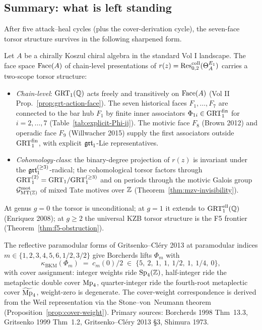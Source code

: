 \subsection*{Summary: what is left standing}

After five attack--heal cycles (plus the cover-derivation cycle), the
seven-face torsor structure survives in the following sharpened form.

\begin{theorem}\ClaimStatusScoped
\label{thm:seven-faces-two-scope}
Let $A$ be a chirally Koszul chiral algebra in the standard Vol I
landscape. The face space $\mathrm{Face}(A)$ of chain-level presentations of
$r(z) = \operatorname{Res}^{\mathrm{coll}}_{0,2}(\Theta_A^{E_1})$ carries a two-scope
torsor structure:
\begin{itemize}
\item[(A)] \emph{Chain-level}: $\mathrm{GRT}_1(\mathbb{Q})$ acts freely and transitively
on $\mathrm{Face}(A)$ (Vol II Prop.~\ref{prop:grt-action-face}). The seven
historical faces $F_1, \dots, F_7$ are connected to the bar hub $F_1$
by finite inner associators
$\Phi_{1i} \in \mathrm{GRT}_1^{\mathrm{fin}}$ for $i = 2, \dots, 7$
(Table~\ref{tab:explicit-Phi-ij}). The motivic face $F_8$ (Brown 2012)
and operadic face $F_9$ (Willwacher 2015) supply the first
associators outside $\mathrm{GRT}_1^{\mathrm{fin}}$, with explicit $\mathfrak{grt}_1$-Lie
representatives.
\item[(B)] \emph{Cohomology-class}: the binary-degree projection of
$r(z)$ is invariant under the $\mathfrak{grt}_1^{(\ge 3)}$-radical; the
cohomological torsor factors through $\mathrm{GRT}_1^{(2)} = \mathrm{GRT}_1/\mathrm{GRT}_1^{(\ge 3)}$
and on periods through the motivic Galois group
$\mathcal{G}^{\mathrm{mot}}_{\mathrm{MT}(\mathbb{Z})}$ of mixed Tate motives over $\mathbb{Z}$
(Theorem~\ref{thm:mzv-invisibility}).
\end{itemize}
At genus $g = 0$ the torsor is unconditional; at $g = 1$ it extends to
$\mathrm{GRT}_1^{\mathrm{ell}}(\mathbb{Q})$ (Enriquez 2008); at $g \ge 2$ the universal
KZB torsor structure is the F5 frontier
(Theorem~\ref{thm:f5-obstruction}).
\end{theorem}

\begin{theorem}
\ClaimStatusTheorem
\label{thm:eight-form-spread-plus-covers}
The reflective paramodular forms of Gritsenko--Cl\'ery 2013 at
paramodular indices $m \in \{1, 2, 3, 4, 5, 6, 1/2, 3/2\}$ give
Borcherds lifts $\Phi_m$ with
\[
  \kappa_{\mathrm{BKM}}(\Phi_m) \;=\; c_m(0)/2
  \;\in\; \{5,\ 2,\ 1,\ 1,\ 1/2,\ 1,\ 1/4,\ 0\},
\]
with cover assignment: integer weights ride $\mathrm{Sp}_4(\mathbb{Z})$, half-integer
ride the metaplectic double cover $\mathrm{Mp}_4$, quarter-integer ride the
fourth-root metaplectic cover $\widetilde{\mathrm{Mp}}_4$, weight-zero is degenerate.
The cover-weight correspondence is derived from the Weil representation
via the Stone--von~Neumann theorem
(Proposition~\ref{prop:cover-weight}). Primary sources:
Borcherds 1998 Thm~13.3, Gritsenko 1999 Thm~1.2, Gritsenko--Cl\'ery 2013
\S3, Shimura 1973.
\end{theorem}

